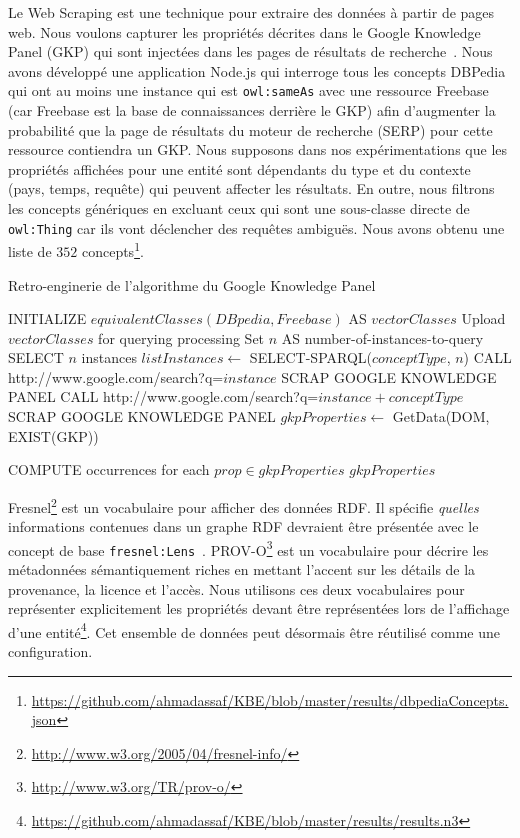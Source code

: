Le Web Scraping est une technique pour extraire des donn\'{e}es à partir de pages web. Nous voulons capturer les propri\'{e}t\'{e}s d\'{e}crites dans le Google Knowledge Panel (GKP) qui sont inject\'{e}es dans les pages de r\'{e}sultats de recherche~\cite{Bergman:GKG:12}. Nous avons d\'{e}velopp\'{e} une application Node.js qui interroge tous les concepts DBPedia qui ont au moins une instance qui est \texttt{owl:sameAs} avec une ressource Freebase (car Freebase est la base de connaissances derri\`{e}re le GKP) afin d'augmenter la probabilit\'{e} que la page de r\'{e}sultats du moteur de recherche (SERP) pour cette ressource contiendra un GKP. Nous supposons dans nos exp\'{e}rimentations que les propri\'{e}t\'{e}s affich\'{e}es pour une entit\'{e} sont d\'{e}pendants du type et du contexte (pays, temps, requête) qui peuvent affecter les r\'{e}sultats. En outre, nous filtrons les concepts g\'{e}n\'{e}riques en excluant ceux qui sont une sous-classe directe de \texttt{owl:Thing} car ils vont d\'{e}clencher des requêtes ambiguës. Nous avons obtenu une liste de $352$ concepts\footnote{\url{https://github.com/ahmadassaf/KBE/blob/master/results/dbpediaConcepts.json}}.

\begin{algorithm}[ht]
\caption{Retro-enginerie de l'algorithme du Google Knowledge Panel}
\begin{algorithmic}[1]
\small
\STATE INITIALIZE $equivalentClasses(DBpedia,Freebase) $ AS $vectorClasses$
\STATE Upload $vectorClasses$ for querying processing
\STATE Set $n$ AS number-of-instances-to-query
\STATE SELECT $n$ instances
\STATE $listInstances \leftarrow$ SELECT-SPARQL($conceptType$, $n$)
\STATE CALL http://www.google.com/search?q=$instance$
\STATE SCRAP GOOGLE KNOWLEDGE PANEL
\ELSE
\STATE CALL http://www.google.com/search?q=$instance + conceptType$
\STATE SCRAP GOOGLE KNOWLEDGE PANEL
\ENDIF
\STATE $gkpProperties \leftarrow$ GetData(DOM, EXIST(GKP))

\ENDFOR
\STATE COMPUTE occurrences for each $prop \in gkpProperties$
\ENDFOR
\STATE $gkpProperties$
\end{algorithmic}
\end{algorithm}

Fresnel\footnote{\url{http://www.w3.org/2005/04/fresnel-info/}} est un vocabulaire pour afficher des donn\'{e}es RDF. Il sp\'{e}cifie \textit{quelles} informations contenues dans un graphe RDF devraient être pr\'{e}sent\'{e}e avec le concept de base \texttt{fresnel:Lens}~\cite{Pietriga:ISWC:06}. PROV-O\footnote{\url{http://www.w3.org/TR/prov-o/}} est un vocabulaire pour d\'{e}crire les m\'{e}tadonn\'{e}es s\'{e}mantiquement riches en mettant l'accent sur les d\'{e}tails de la provenance, la licence et l'acc\`{e}s. Nous utilisons ces deux vocabulaires pour repr\'{e}senter explicitement les propri\'{e}t\'{e}s devant être repr\'{e}sent\'{e}es lors de l'affichage d'une entit\'{e}\footnote{\url{https://github.com/ahmadassaf/KBE/blob/master/results/results.n3}}. Cet ensemble de donn\'{e}es peut d\'{e}sormais être r\'{e}utilis\'{e} comme une configuration.


